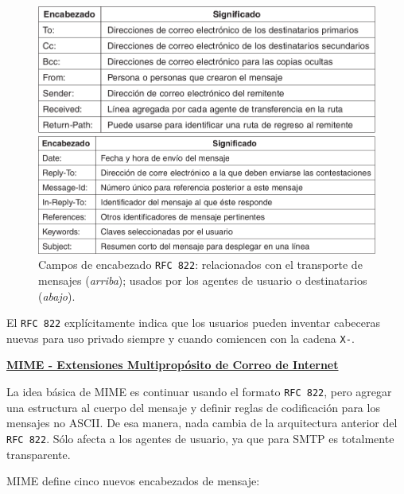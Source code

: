 \documentclass[10pt,a4paper]{article}
\begin{document}
\begin{figure}[ht!]
  \caption{Campos de encabezado \texttt{RFC 822}: relacionados con el transporte de mensajes (\textit{arriba}); usados por los agentes de usuario o destinatarios (\textit{abajo}).}
  \label{fig.:encabezado_RFC822}
  \centerline
  {\includegraphics[width=.65\textwidth-\fboxrule-\fboxrule]{imgs/encabezado_RFC822.png}}
  \vspace{10pt}
  \centerline
  {\includegraphics[width=.65\textwidth-\fboxrule-\fboxrule]{imgs/encabezado_RFC822_2.png}}  
\end{figure}

El \texttt{RFC 822} explícitamente indica que los usuarios pueden inventar cabeceras nuevas para uso privado siempre y cuando comiencen con la cadena \texttt{X-}.

\underline{\textbf{MIME - Extensiones Multipropósito de Correo de Internet}}

La idea básica de MIME es continuar usando el formato \texttt{RFC 822}, pero agregar una estructura al cuerpo del mensaje y definir reglas de codificación para los mensajes no ASCII. De esa manera, nada cambia de la arquitectura anterior del \texttt{RFC 822}. Sólo afecta a los agentes de usuario, ya que para SMTP es totalmente transparente.

MIME define cinco nuevos encabezados de mensaje:
\end{document}
